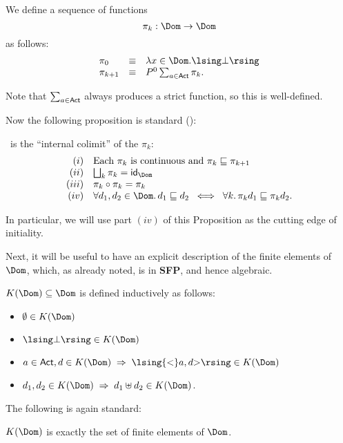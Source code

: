 \begin{definition}
{\rm We define a sequence of functions
\[ \pi_{k} : \Dom \rightarrow \Dom \]
as follows:
\[ \begin{array}{lll}
\pi_{0} & \equiv & \lambda x \in \Dom . \lsing \bot \rsing \\
\pi_{k+1} & \equiv & P^{0} \sum_{a \in {\sf Act}} \pi_{k} .
\end{array} \] }
\end{definition}
Note that $\sum_{a \in {\sf Act}}$ always produces a strict function, so this is
well-defined.

Now the following proposition is standard (\cite[Chapter 5 Theorem 3]{PloLN}):
\begin{proposition}
\label{icolim}
\Dom\ is the ``internal colimit'' of the $\pi_{k}$:
\[ \begin{array}{rl}
(i) & \mbox{Each $\pi_{k}$ is continuous and $\pi_{k} \sqsubseteq
\pi_{k+1}$} \\
(ii) & \bigsqcup_{k} \pi_{k} = {\sf id}_{\Dom} \\
(iii) & \pi_{k} \circ \pi_{k} = \pi_{k} \\
(iv) & \forall d_{1}, d_{2} \in \Dom . \, d_{1} \sqsubseteq d_{2} \;\;
\Longleftrightarrow \;\; \forall k . \, \pi_{k} d_{1} \sqsubseteq \pi_{k} d_{2} .
\end{array} \]
\end{proposition}
In particular, we will use part $(iv)$ of this Proposition as the
cutting edge of initiality.

Next, it will be useful to have an explicit description of the finite
elements of $\Dom$, which, as already noted, is in {\bf SFP}, and hence
algebraic.

\begin{definition}
\label{felts}
{\rm $K(\Dom ) \subseteq \Dom$ is defined inductively as follows:}
\begin{itemize}
\item $\emptyset \in K(\Dom )$
\item $\lsing \bot \rsing \in K(\Dom )$
\item $a \in {\sf Act}, d \in K(\Dom ) \; \Rightarrow \; \lsing {<}a, d{>} \rsing
\in K(\Dom )$
\item $d_{1}, d_{2} \in K(\Dom ) \; \Rightarrow \; d_{1} \uplus d_{2} \in
K(\Dom )$.
\end{itemize}
\end{definition}
The following is again standard:
\begin{proposition}
\label{feltp}
$ K(\Dom )$ is exactly the set of finite elements of $\Dom$.
\end{proposition}

